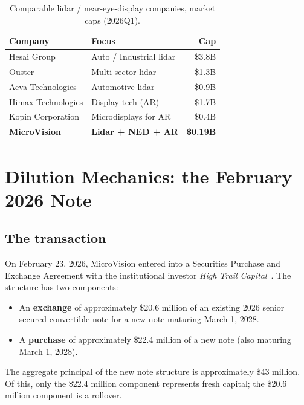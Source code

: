 \documentclass[10pt,letterpaper,twocolumn]{article}
\begin{document}
\begin{table}[h]
\footnotesize
\centering
\setlength{\tabcolsep}{4pt}
\begin{tabularx}{\columnwidth}{lXr}
\toprule
\textbf{Company} & \textbf{Focus} & \textbf{Cap} \\
\midrule
Hesai Group & Auto / Industrial lidar & \$3.8B \\
Ouster & Multi-sector lidar & \$1.3B \\
Aeva Technologies & Automotive lidar & \$0.9B \\
Himax Technologies & Display tech (AR) & \$1.7B \\
Kopin Corporation & Microdisplays for AR & \$0.4B \\
\textbf{MicroVision} & \textbf{Lidar + NED + AR} & \textbf{\$0.19B} \\
\bottomrule
\end{tabularx}
\caption{Comparable lidar / near-eye-display companies, market caps (2026Q1).}
\label{tab:peers}
\end{table}

\section{Dilution Mechanics: the February 2026 Note}\label{sec:dilution}

\subsection{The transaction}

On February 23, 2026, MicroVision entered into a Securities Purchase and Exchange Agreement with the institutional investor \emph{High Trail Capital}~\citep{mvis2026notes,stocktitan2026notes}. The structure has two components:

\begin{itemize}
  \item An \textbf{exchange} of approximately \$20.6 million of an existing 2026 senior secured convertible note for a new note maturing March 1, 2028.
  \item A \textbf{purchase} of approximately \$22.4 million of a new note (also maturing March 1, 2028).
\end{itemize}

The aggregate principal of the new note structure is approximately \$43 million. Of this, only the \$22.4 million component represents fresh capital; the \$20.6 million component is a rollover.
\end{document}
